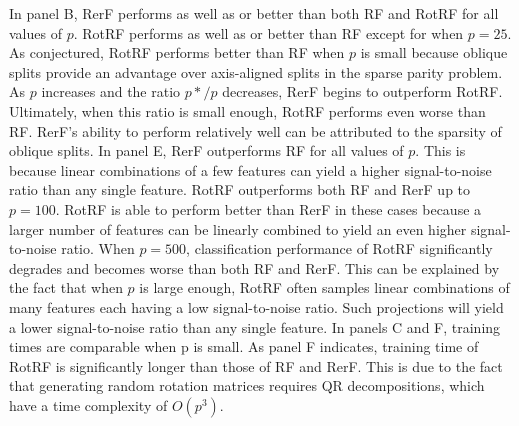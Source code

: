 \documentclass{article}
\begin{document}
In panel B, RerF performs as well as or better than both RF and RotRF for all values of $p$. RotRF performs as well as or better than RF except for when $p = 25$. As conjectured, RotRF performs better than RF when $p$ is small because oblique splits provide an advantage over axis-aligned splits in the sparse parity problem. As $p$ increases and the ratio $p*/p$ decreases, RerF begins to outperform RotRF. Ultimately, when this ratio is small enough, RotRF performs even worse than RF. RerF's ability to perform relatively well can be attributed to the sparsity of oblique splits. In panel E, RerF outperforms RF for all values of $p$. This is because linear combinations of a few features can yield a higher signal-to-noise ratio than any single feature. RotRF outperforms both RF and RerF up to $p = 100$. RotRF is able to perform better than RerF in these cases because a larger number of features can be linearly combined to yield an even higher signal-to-noise ratio. When $p = 500$, classification performance of RotRF significantly degrades and becomes worse than both RF and RerF. This can be explained by the fact that when $p$ is large enough, RotRF often samples linear combinations of many features each having a low signal-to-noise ratio. Such projections will yield a lower signal-to-noise ratio than any single feature. In panels C and F, training times are comparable when p is small. As panel F indicates, training time of RotRF is significantly longer than those of RF and RerF. This is due to the fact that generating random rotation matrices requires QR decompositions, which have a time complexity of $O(p^3)$.
\end{document}
